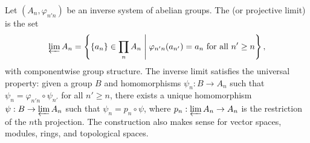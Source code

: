 Let $(A_n, \varphi_{n'n})$ be an inverse system of abelian groups. The  (or projective limit) is the set
$$\varprojlim A_n = \left\{ \{a_n\} \in \prod_{n} A_n \;\middle|\; \varphi_{n'n}(a_{n'}) = a_n \text{ for all } n' \geq n \right\},$$
with componentwise group structure. The inverse limit satisfies the universal property: given a group $B$ and homomorphisms $\psi_n: B \to A_n$ such that $\psi_n = \varphi_{n'n} \circ \psi_{n'}$ for all $n' \geq n$, there exists a unique homomorphism $\psi: B \to \varprojlim A_n$ such that $\psi_n = p_n \circ \psi$, where $p_n: \varprojlim A_n \to A_n$ is the restriction of the $n$th projection. The construction also makes sense for vector spaces, modules, rings, and topological spaces.
